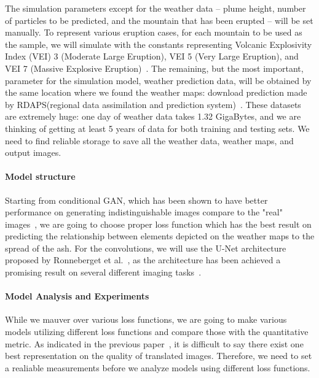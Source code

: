 \documentclass{article}
\begin{document}
\begin{doublespacing}
{  The simulation parameters except for the weather data – plume height, number of particles to be 
  predicted, and the mountain that has been erupted – will be set manually. To represent various 
  eruption cases, for each mountain to be used as the sample, we will simulate with the constants 
  representing Volcanic Explosivity Index (VEI) 3 (Moderate Large Eruption), VEI 5 (Very Large 
  Eruption), and VEI 7 (Massive Explosive Eruption)~\citep[p. 1232]{Newhall1982}. The remaining, but
  the most important, parameter for the simulation model, weather prediction data, will be obtained 
  by the same location where we found the weather maps: download prediction made by RDAPS(regional 
  data assimilation and prediction system)~\citep{MDOP}. These datasets are extremely huge: one day 
  of weather data takes 1.32 GigaBytes, and we are thinking of getting at least 5 years of data for 
  both training and testing sets. We need to find reliable storage to save all the weather data, 
  weather maps, and output images.

  \paragraph{Model structure}
  Starting from conditional GAN, which has been shown to have better performance on generating 
  indistinguishable images compare to the "real" images~\citet{isola2016imagetoimage}, we are going 
  to choose proper loss function which has the best result on predicting the relationship between 
  elements depicted on the weather maps to the spread of the ash. For the convolutions, we will use
  the U-Net architecture proposed by Ronneberget et al.~\citet{ronneberger2015unet}, as the
  architecture has been achieved a promising result on several different imaging 
  tasks~\citep{isola2016imagetoimage, james2018simtoreal}.

  \paragraph{Model Analysis and Experiments}
  While we mauver over various loss functions, we are going to make various models utilizing 
  different loss functions and compare those with the quantitative metric. As indicated in the 
  previous paper~\citet{isola2016imagetoimage}, it is difficult to say there exist one best 
  representation on the quality of translated images. Therefore, we need to set a realiable 
  measurements before we analyze models using different loss functions.

}
\end{doublespacing}
\end{document}
